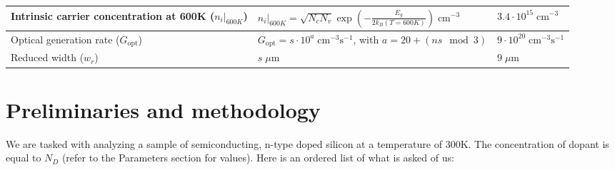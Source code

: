 \documentclass{book}
\begin{document}
\begin{center}
\begin{tabular}{ | m{4.5cm} | m{7.5cm} | m{2.5cm} | }
                    \hline
                        Intrinsic carrier concentration at 600K ($n_i \vert_{600K}$) & $n_{i} \vert_{600K} = \sqrt{N_{c}N_{v}}\exp\left(-\frac{E_{g}}{2k_{B}(T = 600K)}\right) \; \text{cm}^{-3}$ & $3.4 \cdot 10^{15} \; \text{cm}^{-3}$ \\
                    \hline
                        Optical generation rate ($G_{\text{opt}}$) & $G_{\text{opt}} = s \cdot 10^{a} \; \text{cm}^{-3}\text{s}^{-1}$, with $a = 20 + (ns \mod 3)$ & $9 \cdot 10^{20} \; \text{cm}^{-3}\text{s}^{-1}$ \\
                    \hline 
                        Reduced width ($w_{r}$) & $s \; \mu$m & $9 \; \mu$m \\
                    \hline 
                \end{tabular}
                \renewcommand{\arraystretch}{1}
            \end{center}

        \vspace{30pt}
        \section{Preliminaries and methodology}
            We are tasked with analyzing a sample of semiconducting, n-type doped silicon at a temperature of 300K.
            The concentration of dopant is equal to $N_D$ (refer to the Parameters section for values).
            Here is an ordered list of what is asked of us:
\end{document}
